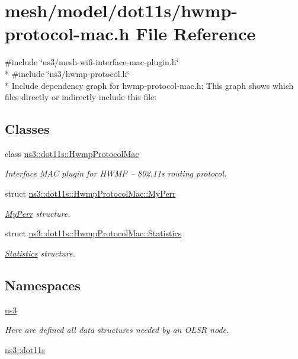 \hypertarget{hwmp-protocol-mac_8h}{}\section{mesh/model/dot11s/hwmp-\/protocol-\/mac.h File Reference}
\label{hwmp-protocol-mac_8h}
{\ttfamily \#include \char`\"{}ns3/mesh-\/wifi-\/interface-\/mac-\/plugin.\+h\char`\"{}}\\*
{\ttfamily \#include \char`\"{}ns3/hwmp-\/protocol.\+h\char`\"{}}\\*
Include dependency graph for hwmp-\/protocol-\/mac.h\+:
This graph shows which files directly or indirectly include this file\+:
\subsection*{Classes}
\begin{DoxyCompactItemize}
\item 
class \hyperlink{classns3_1_1dot11s_1_1HwmpProtocolMac}{ns3\+::dot11s\+::\+Hwmp\+Protocol\+Mac}
\begin{DoxyCompactList}\small\item\em Interface M\+AC plugin for H\+W\+MP -- 802.\+11s routing protocol. \end{DoxyCompactList}\item 
struct \hyperlink{structns3_1_1dot11s_1_1HwmpProtocolMac_1_1MyPerr}{ns3\+::dot11s\+::\+Hwmp\+Protocol\+Mac\+::\+My\+Perr}
\begin{DoxyCompactList}\small\item\em \hyperlink{structns3_1_1dot11s_1_1HwmpProtocolMac_1_1MyPerr}{My\+Perr} structure. \end{DoxyCompactList}\item 
struct \hyperlink{structns3_1_1dot11s_1_1HwmpProtocolMac_1_1Statistics}{ns3\+::dot11s\+::\+Hwmp\+Protocol\+Mac\+::\+Statistics}
\begin{DoxyCompactList}\small\item\em \hyperlink{structns3_1_1dot11s_1_1HwmpProtocolMac_1_1Statistics}{Statistics} structure. \end{DoxyCompactList}\end{DoxyCompactItemize}
\subsection*{Namespaces}
\begin{DoxyCompactItemize}
\item 
 \hyperlink{namespacens3}{ns3}
\begin{DoxyCompactList}\small\item\em Here are defined all data structures needed by an O\+L\+SR node. \end{DoxyCompactList}\item 
 \hyperlink{namespacens3_1_1dot11s}{ns3\+::dot11s}
\end{DoxyCompactItemize}
